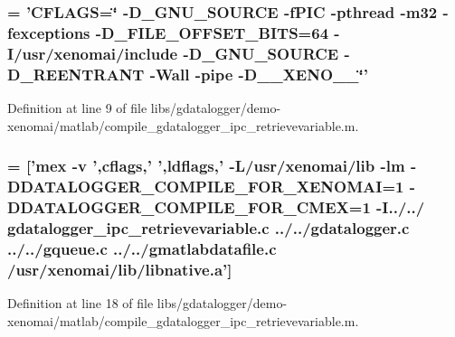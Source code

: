 \subsubsection[{cflags}]{ = 'CFLAGS=\char`\"{} -\/D\_\-GNU\_\-SOURCE -\/fPIC -\/pthread -\/m32 -\/fexceptions -\/D\_\-FILE\_\-OFFSET\_\-BITS=64 -\/I/usr/xenomai/include -\/D\_\-GNU\_\-SOURCE -\/D\_\-REENTRANT -\/Wall -\/pipe -\/D\_\-\_\-XENO\_\-\_\-\char`\"{}'}\label{libs_2gdatalogger_2demo-xenomai_2matlab_2compile__gdatalogger__ipc__retrievevariable_8m_a4168f70910e5a6f034a3c51d07210799}


Definition at line 9 of file libs/gdatalogger/demo-\/xenomai/matlab/compile\_\-gdatalogger\_\-ipc\_\-retrievevariable.m.
\subsubsection[{command}]{ = ['mex -\/v ',{\bf cflags},' ',{\bf ldflags},' -\/L/usr/xenomai/lib -\/lm -\/DDATALOGGER\_\-COMPILE\_\-FOR\_\-XENOMAI=1 -\/DDATALOGGER\_\-COMPILE\_\-FOR\_\-CMEX=1 -\/I../../ gdatalogger\_\-ipc\_\-retrievevariable.c ../../gdatalogger.c ../../gqueue.c ../../gmatlabdatafile.c /usr/xenomai/lib/{\bf libnative.a}']}\label{libs_2gdatalogger_2demo-xenomai_2matlab_2compile__gdatalogger__ipc__retrievevariable_8m_a9e0992eae3950adccaf4847fbff4231d}


Definition at line 18 of file libs/gdatalogger/demo-\/xenomai/matlab/compile\_\-gdatalogger\_\-ipc\_\-retrievevariable.m.
